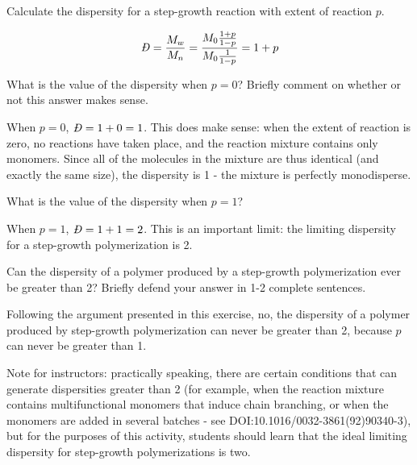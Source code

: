 \begin{activity}
\begin{model}
\end{model}

\begin{ctqs}
		\question Calculate the dispersity for a step-growth reaction with extent of reaction $p$.
		
			\begin{solution}[1.25in]
			
				\begin{equation*}
					\PDImath = \frac{M_w}{M_n} = \frac{M_0\frac{1+p}{1-p}}{M_0\frac{1}{1-p}} = 1+p
				\end{equation*}
			\end{solution}
			
			
		\question What is the value of the dispersity when $p=0$?  Briefly comment on whether or not this answer makes sense.
		
			\begin{solution}[1.5in]
			
				When $p=0$, $\PDImath=1+0 = 1$.  This does make sense: when the extent of reaction is zero, no reactions have taken place, and the reaction mixture contains only monomers.  Since all of the molecules in the mixture are thus identical (and exactly the same size), the dispersity is 1 - the mixture is perfectly monodisperse.
			
			\end{solution}
			
			
		\question What is the value of the dispersity when $p=1$?
		
			\begin{solution}[1in]
			
				When $p=1$, $\PDImath=1+1=2$.  This is an important limit: the limiting dispersity for a step-growth polymerization is 2.
			
			\end{solution}
			
			
			
		\question Can the dispersity of a polymer produced by a step-growth polymerization ever be greater than 2?  Briefly defend your answer in 1-2 complete sentences.
		
			\begin{solution}[1.5in]
			
				Following the argument presented in this exercise, no, the dispersity of a polymer produced by step-growth polymerization can never be greater than 2, because $p$ can never be greater than 1. 
				
				Note for instructors: practically speaking, there are certain conditions that can generate dispersities greater than 2 (for example, when the reaction mixture contains multifunctional monomers that induce chain branching, or when the monomers are added in several batches - see DOI:10.1016/0032-3861(92)90340-3), but for the purposes of this activity, students should learn that the ideal limiting dispersity for step-growth polymerizations is two.
			

\end{solution}
\end{ctqs}
\end{activity}
